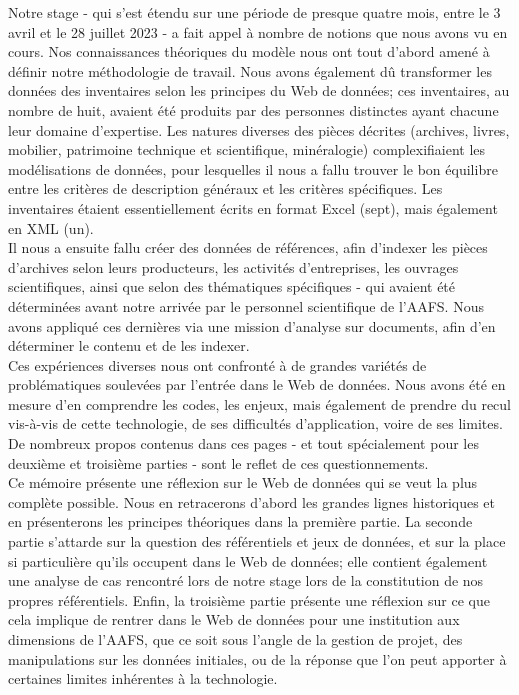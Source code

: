 \documentclass[a4paper,12pt,twoside]{book}
\begin{document}
Notre stage - qui s'est étendu sur une période de presque quatre mois, entre le 3 avril et le 28 juillet 2023 - a fait appel à nombre de notions que nous avons vu en cours. Nos connaissances théoriques du modèle nous ont tout d'abord amené à définir notre méthodologie de travail. Nous avons également dû transformer les données des inventaires selon les principes du Web de données; ces inventaires, au nombre de huit, avaient été produits par des personnes distinctes ayant chacune leur domaine d'expertise. Les natures diverses des pièces décrites (archives, livres, mobilier, patrimoine technique et scientifique, minéralogie) complexifiaient les modélisations de données, pour lesquelles il nous a fallu trouver le bon équilibre entre les critères de description généraux et les critères spécifiques. Les inventaires étaient essentiellement écrits en format Excel (sept), mais également en XML (un).\\

Il nous a ensuite fallu créer des données de références, afin d'indexer les pièces d'archives selon leurs producteurs, les activités d'entreprises, les ouvrages scientifiques, ainsi que selon des thématiques spécifiques - qui avaient été déterminées avant notre arrivée par le personnel scientifique de l'AAFS. Nous avons appliqué ces dernières via une mission d'analyse sur documents, afin d'en déterminer le contenu et de les indexer.\\

Ces expériences diverses nous ont confronté à de grandes variétés de problématiques soulevées par l'entrée dans le Web de données. Nous avons été en mesure d'en comprendre les codes, les enjeux, mais également de prendre du recul vis-à-vis de cette technologie, de ses difficultés d'application, voire de ses limites. De nombreux propos contenus dans ces pages - et tout spécialement pour les deuxième et troisième parties - sont le reflet de ces questionnements.\\

Ce mémoire présente une réflexion sur le Web de données qui se veut la plus complète possible. Nous en retracerons d'abord les grandes lignes historiques et en présenterons les principes théoriques dans la première partie. La seconde partie s'attarde sur la question des référentiels et jeux de données, et sur la place si particulière qu'ils occupent dans le Web de données; elle contient également une analyse de cas rencontré lors de notre stage lors de la constitution de nos propres référentiels. Enfin, la troisième partie présente une réflexion sur ce que cela implique de rentrer dans le Web de données pour une institution aux dimensions de l'AAFS, que ce soit sous l'angle de la gestion de projet, des manipulations sur les données initiales, ou de la réponse que l'on peut apporter à certaines limites inhérentes à la technologie. 
\end{document}
